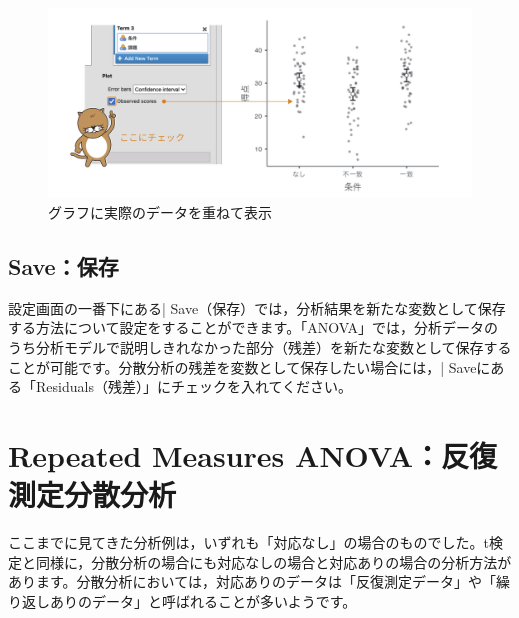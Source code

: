 \documentclass[
  12pt,
  a5jpaper,
  lualatex, ja=standard]{bxjsbook}
\begin{document}
\begin{figure}[!ht]

{\centering \includegraphics[width=1\linewidth]{images/ANOVA/anova-emm-observed} 

}

\caption{グラフに実際のデータを重ねて表示}\label{fig:ANOVA-anova-emm-observed}
\end{figure}

\hypertarget{sub:ANOVA-anova-save}{%
\subsection{Save：保存}\label{sub:ANOVA-anova-save}}

設定画面の一番下にある\colorbox{bar}{\textcolor{gmoji2}{| Save}}（保存）では，分析結果を新たな変数として保存する方法について設定をすることができます。「ANOVA」では，分析データのうち分析モデルで説明しきれなかった部分（残差）を新たな変数として保存することが可能です。分散分析の残差を変数として保存したい場合には，\colorbox{bar}{\textcolor{gmoji2}{| Save}}にある「Residuals（残差）」にチェックを入れてください。

\hypertarget{sec:ANOVA-rm}{%
\section{Repeated Measures ANOVA：反復測定分散分析}\label{sec:ANOVA-rm}}

ここまでに見てきた分析例は，いずれも「対応なし」の場合のものでした。t検定と同様に，分散分析の場合にも対応なしの場合と対応ありの場合の分析方法があります。分散分析においては，対応ありのデータは「反復測定データ」や「繰り返しありのデータ」と呼ばれることが多いようです。
\end{document}
